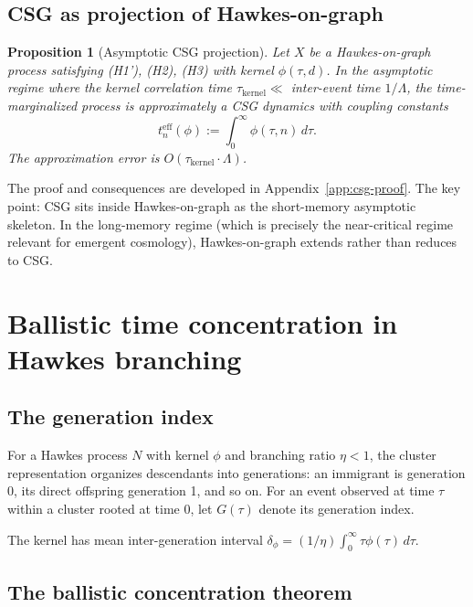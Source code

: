 \documentclass[11pt,a4paper]{article}
\newtheorem{proposition}[theorem]{Proposition}
\begin{document}
\subsection{CSG as projection of Hawkes-on-graph}

\begin{proposition}[Asymptotic CSG projection]
\label{prop:csg-projection}
Let $X$ be a Hawkes-on-graph process satisfying (H1'), (H2), (H3) with kernel $\phi(\tau, d)$. In the asymptotic regime where the kernel correlation time $\tau_{\mathrm{kernel}} \ll$ inter-event time $1/\Lambda$, the time-marginalized process is approximately a CSG dynamics with coupling constants
\begin{equation}
t_n^{\mathrm{eff}}(\phi) := \int_0^\infty \phi(\tau, n)\, d\tau.
\end{equation}
The approximation error is $O(\tau_{\mathrm{kernel}} \cdot \Lambda)$.
\end{proposition}

The proof and consequences are developed in Appendix~\ref{app:csg-proof}. The key point: CSG sits inside Hawkes-on-graph as the short-memory asymptotic skeleton. In the long-memory regime (which is precisely the near-critical regime relevant for emergent cosmology), Hawkes-on-graph extends rather than reduces to CSG.

\section{Ballistic time concentration in Hawkes branching}

\subsection{The generation index}

For a Hawkes process $N$ with kernel $\phi$ and branching ratio $\eta < 1$, the cluster representation \cite{HawkesOakes1974} organizes descendants into generations: an immigrant is generation 0, its direct offspring generation 1, and so on. For an event observed at time $\tau$ within a cluster rooted at time 0, let $G(\tau)$ denote its generation index.

The kernel has mean inter-generation interval $\delta_\phi = (1/\eta)\int_0^\infty \tau \phi(\tau)\,d\tau$.

\subsection{The ballistic concentration theorem}
\end{document}
